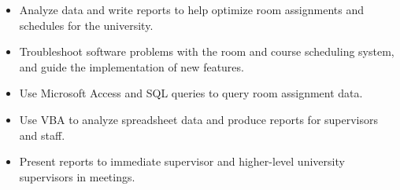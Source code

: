 \documentclass{article}
\begin{document}
\begin{description}
  \begin{itemize}
    \item Analyze data and write reports to help optimize room assignments and schedules for the university.
    \item Troubleshoot software problems with the room and course scheduling system, and guide the implementation of new features.
    \item Use Microsoft Access and SQL queries to query room assignment data.
    \item Use VBA to analyze spreadsheet data and produce reports for supervisors and staff.
    \item Present reports to immediate supervisor and higher-level university supervisors in meetings.
  \end{itemize}
\end{description}

\vspace{-1em}
\end{document}
